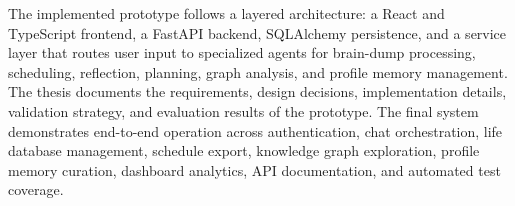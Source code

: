 \documentclass[a4paper,12pt,oneside]{report}
\begin{document}
The implemented prototype follows a layered architecture: a React and TypeScript frontend, a FastAPI backend, SQLAlchemy persistence, and a service layer that routes user input to specialized agents for brain-dump processing, scheduling, reflection, planning, graph analysis, and profile memory management. The thesis documents the requirements, design decisions, implementation details, validation strategy, and evaluation results of the prototype. The final system demonstrates end-to-end operation across authentication, chat orchestration, life database management, schedule export, knowledge graph exploration, profile memory curation, dashboard analytics, API documentation, and automated test coverage.

\tableofcontents
\cleardoublepage
{}


\cleardoublepage

\cleardoublepage

\cleardoublepage

\cleardoublepage

\cleardoublepage

\cleardoublepage

{}
\printbibliography[title={Bibliography}]
\cleardoublepage

{}
\listoffigures
\cleardoublepage

{}
\listoftables
\cleardoublepage

{}
\lstlistoflistings
\cleardoublepage

\glsaddall
\printglossary[title={Glossary}]
\cleardoublepage
\printglossary[type=\acronymtype,title={Acronyms}]
\end{document}
